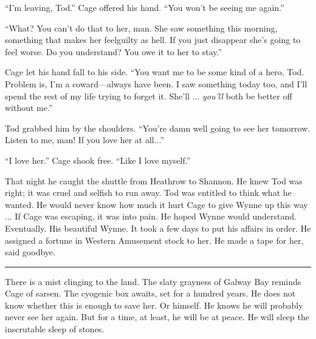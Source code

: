 ``I'm leaving, Tod.'' Cage offered his hand. ``You won't be seeing me again.''

``What? You can't do that to her, man. She saw something this morning, something that makes her feelguilty as hell. If you just disappear she's going to feel worse. Do you understand? You owe it to her to stay.''

Cage let his hand fall to his side. ``You want me to be some kind of a hero, Tod. Problem is, I'm a coward---always have been. I saw something today too, and I'll spend the rest of my life trying to forget it. She'll ... \textit{you'll} both be better off without me.''

Tod grabbed him by the shoulders. ``You're damn well going to see her tomorrow. Listen to me, man! If you love her at all...''

``I love her.'' Cage shook free. ``Like I love myself.''

That night he caught the shuttle from Heathrow to Shannon. He knew Tod was right; it was cruel and selfish to run away. Tod was entitled to think what he wanted. He would never know how much it hurt Cage to give Wynne up this way ... If Cage was escaping, it was into pain. He hoped Wynne would understand. Eventually. His beautiful Wynne. It took a few days to put his affairs in order. He assigned a fortune in Western Amusement stock to her. He made a tape for her, said goodbye.

\fancybreak{* * *}

There is a mist clinging to the land. The slaty grayness of Galway Bay reminds Cage of sarsen. The cyogenic box awaits, set for a hundred years. He does not know whether this is enough to save her. Or himself. He knows he will probably never see her again. But for a time, at least, he will be at peace. He will sleep the inscrutable sleep of stones.